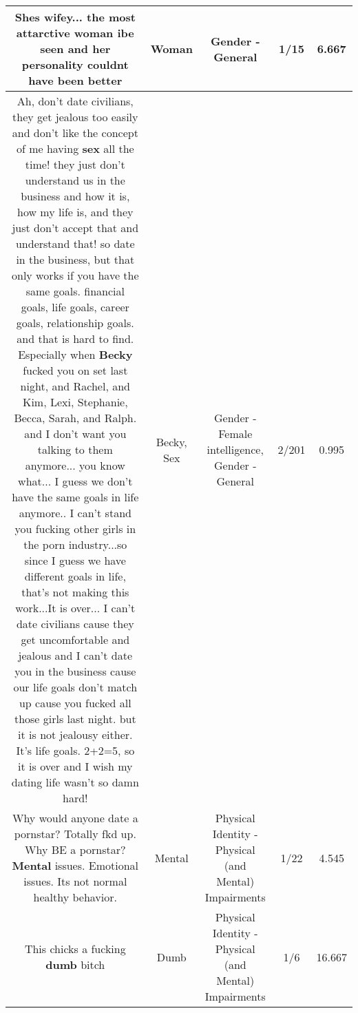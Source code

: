 \documentclass[11pt]{article}
\newlength\mylength
\begin{document}
\begin{center}
\begin{longtable}{|C{.65\mylength}|C{.30\mylength}|C{.12\mylength}|C{.12\mylength}|C{.12\mylength}|}
  \small Shes wifey... the most attarctive \textbf{woman} ibe seen and her personality couldnt have been better\normalsize   & Woman & Gender - General & 1/15 & 6.667 \\  \hline
  \small Ah, don't date civilians, they get jealous too easily and don't like the concept of me having \textbf{sex} all the time! they just don't understand us in the business and how it is, how my life is, and they just don't accept that and understand that! so date in the business, but that only works if you have the same goals. financial goals, life goals, career goals, relationship goals. and that is hard to find. Especially when \textbf{Becky} fucked you on set last night, and Rachel, and Kim, Lexi, Stephanie, Becca, Sarah, and Ralph. and I don't want you talking to them anymore... you know what... I guess we don't have the same goals in life anymore.. I can't stand you fucking other girls in the porn industry...so since I guess we have different goals in life, that's not making this work...It is over... I can't date civilians cause they get uncomfortable and jealous and I can't date you in the business cause our life goals don't match up cause you fucked all those girls last night. but it is not jealousy either. It's life goals. 2+2=5, so it is over and I wish my dating life wasn't so damn hard!\normalsize   & Becky, Sex & Gender - Female intelligence, Gender - General & 2/201 & 0.995 \\  \hline
  \small Why would anyone date a pornstar? Totally fkd up. Why BE a pornstar? \textbf{Mental} issues. Emotional issues. Its not normal healthy behavior.\normalsize   & Mental & Physical Identity - Physical (and Mental) Impairments & 1/22 & 4.545 \\  \hline
  \small This chicks a fucking \textbf{dumb} bitch\normalsize   & Dumb & Physical Identity - Physical (and Mental) Impairments & 1/6 & 16.667 \\  \hline

\end{longtable}
\end{center}
\end{document}
